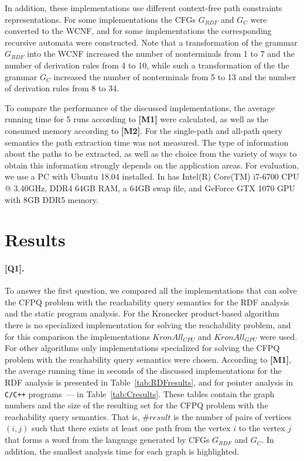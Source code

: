 In addition, these implementations use different context-free path constraints representations. For some implementations the CFGs $G_{\textit{RDF}}$ and $G_C$ were converted to the WCNF, and for some implementations the corresponding recursive automata were constructed. Note that a transformation of the grammar $G_{\textit{RDF}}$ into the WCNF increased the number of nonterminals from 1 to 7 and the number of derivation rules from 4 to 10, while such a transformation of the the grammar $G_C$ increased the number of nonterminals from 5 to 13 and the number of derivation rules from 8 to 34.

To compare the performance of the discussed implementations, the average running time for 5 runs according to \textbf{[M1]} were calculated, as well as the consumed memory according to \textbf{[M2]}. For the single-path and all-path query semantics the path extraction time was not measured. The type of information about the paths to be extracted, as well as the choice from the variety of ways to obtain this information strongly depends on the application areas. For evaluation, we use a PC with Ubuntu 18.04 installed. In has Intel(R) Core(TM) i7-6700 CPU @ 3.40GHz, DDR4 64GB RAM, a 64GB swap file, and GeForce GTX 1070 GPU with 8GB DDR5 memory.

\section{Results}\label{sec:ch5/sect2}

\paragraph{[Q1].} To answer the first question, we compared all the implementations that can solve the CFPQ problem with the reachability query semantics for the RDF analysis and the static program analysis. For the Kronecker product-based algorithm there is no specialized implementation for solving the reachability problem, and for this comparison the implementations $\textit{KronAll}_{\textit{CPU}}$ and $\textit{KronAll}_{\textit{GPU}}$ were used. For other algorithms only implementations specialized for solving the CFPQ problem with the reachability query semantics were chosen. According to \textbf{[M1]}, the average running time in seconds of the discussed implementations for the RDF analysis is presented in Table~\ref{tab:RDFresults}, and for pointer analysis in \texttt{C/C++} programs~--- in Table~\ref{tab:Cresults}. These tables contain the graph numbers and the size of the resulting set for the CFPQ problem with the reachability query semantics. That is, $\#\textit{result}$ is the number of pairs of vertices $(i, j)$ such that there exists at least one path from the vertex $i$ to the vertex $j$ that forms a word from the language generated by CFGs $G_{\textit{RDF}}$ and $G_C$. In addition, the smallest analysis time for each graph is highlighted.


